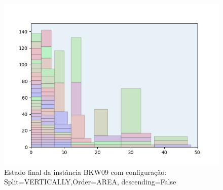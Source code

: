 \begin{figure}[H]
    \centering
    \caption[]{Estado final da instância BKW09 com configuração: Split=VERTICALLY,Order=AREA, descending=False}
    \label{fig:bkw09-vertically-area-false}
    \includegraphics[scale=0.5]{output/figures/bkw/bkw09/vertically/area/false/000}
\end{figure}